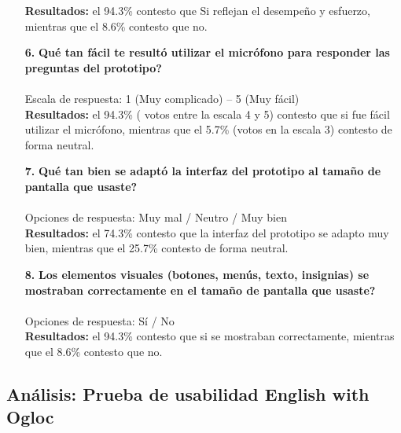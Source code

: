 \begin{enumerate}
\textbf{Resultados: } el 94.3\% contesto que Si reflejan el desempeño y esfuerzo, mientras que el 8.6\% contesto que no.
\\

\item[\textbf{6.}] \textbf{\textquestiondown Qué tan fácil te resultó utilizar el micrófono para responder las preguntas del prototipo?}\\\\
Escala de respuesta: 1 (Muy complicado) -- 5 (Muy fácil)\\

\textbf{Resultados: } el 94.3\% ( votos entre la escala 4 y 5) contesto que si fue fácil utilizar el micrófono, mientras que el 5.7\% (votos en la escala 3) contesto de forma neutral.
\\
\item[\textbf{7.}] \textbf{\textquestiondown Qué tan bien se adaptó la interfaz del prototipo al tamaño de pantalla que usaste?}\\\\
Opciones de respuesta: Muy mal / Neutro / Muy bien\\

\textbf{Resultados: } el 74.3\% contesto que la interfaz del prototipo se adapto muy bien, mientras que el 25.7\% contesto de forma neutral.
\\
\item[\textbf{8.}] \textbf{\textquestiondown Los elementos visuales (botones, menús, texto, insignias) se mostraban correctamente en el tamaño de pantalla que usaste?} \\\\
Opciones de respuesta: Sí / No\\

\textbf{Resultados: } el 94.3\% contesto que si se mostraban correctamente, mientras que el 8.6\% contesto que no.
\\
\end{enumerate}

\newpage
\subsection{Análisis: Prueba de usabilidad English with Ogloc}

